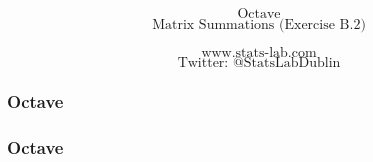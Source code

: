 \documentclass{beamer}
\begin{document}
\begin{frame}
\bigskip
{
\Huge
\[ \mbox{Octave}  \]
}
{
\huge
\[ \mbox{Matrix Summations (Exercise B.2)}  \]
}

{
\LARGE
\[ \mbox{www.stats-lab.com}  \]
\[ \mbox{Twitter: @StatsLabDublin} \]
}
\end{frame}
\begin{frame}
\frametitle{Octave}
{
\Large

}
\end{frame}

\begin{frame}
\frametitle{Octave}
{
\Large

}
\end{frame}
\end{document}
